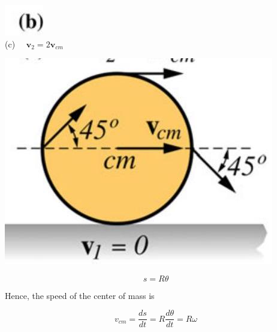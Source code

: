 \documentclass[10pt]{article}
\begin{document}
\includegraphics[max width=\textwidth, center]{2024_09_13_db1f357d2aad0a03eb2eg-132}\\
(c) $\quad \mathbf{v}_{2}=2 \mathbf{v}_{c m}$

\begin{center}
\includegraphics[max width=\textwidth]{2024_09_13_db1f357d2aad0a03eb2eg-132(1)}
\end{center}

$$
s=R \theta
$$

Hence, the speed of the center of mass is

$$
v_{c m}=\frac{d s}{d t}=R \frac{d \theta}{d t}=R \omega
$$
\end{document}
